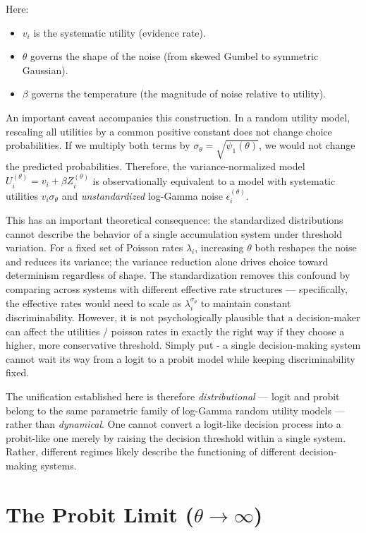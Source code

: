 \documentclass[
  man,
  floatsintext,
  longtable,
  a4paper,
  nolmodern,
  notxfonts,
  notimes,
  colorlinks=true,linkcolor=blue,citecolor=blue,urlcolor=blue]{apa7}
\providecommand{\tightlist}{%
  \setlength{\itemsep}{0pt}\setlength{\parskip}{0pt}}
\begin{document}
Here:

\begin{itemize}
\tightlist
\item
  \(v_i\) is the systematic utility (evidence rate).
\item
  \(\theta\) governs the shape of the noise (from skewed Gumbel to
  symmetric Gaussian).
\item
  \(\beta\) governs the temperature (the magnitude of noise relative to
  utility).
\end{itemize}

An important caveat accompanies this construction. In a random utility
model, rescaling all utilities by a common positive constant does not
change choice probabilities. If we multiply both terms by
\(\sigma_\theta = \sqrt{\psi_1(\theta)}\), we would not change the
predicted probabilities. Therefore, the variance-normalized model
\(U_i^{(\theta)} = v_i + \beta Z_i^{(\theta)}\) is observationally
equivalent to a model with systematic utilities \(v_i \sigma_\theta\)
and \emph{unstandardized} log-Gamma noise \(\epsilon_i^{(\theta)}\).

This has an important theoretical consequence: the standardized
distributions cannot describe the behavior of a single accumulation
system under threshold variation. For a fixed set of Poisson rates
\(\lambda_i\), increasing \(\theta\) both reshapes the noise and reduces
its variance; the variance reduction alone drives choice toward
determinism regardless of shape. The standardization removes this
confound by comparing across systems with different effective rate
structures --- specifically, the effective rates would need to scale as
\(\lambda_i^{\sigma_\theta}\) to maintain constant discriminability.
However, it is not psychologically plausible that a decision-maker can
affect the utilities / poisson rates in exactly the right way if they
choose a higher, more conservative threshold. Simply put - a single
decision-making system cannot wait its way from a logit to a probit
model while keeping discriminability fixed.

The unification established here is therefore \emph{distributional} ---
logit and probit belong to the same parametric family of log-Gamma
random utility models --- rather than \emph{dynamical}. One cannot
convert a logit-like decision process into a probit-like one merely by
raising the decision threshold within a single system. Rather, different
regimes likely describe the functioning of different decision-making
systems.

\section{\texorpdfstring{The Probit Limit
(\(\theta \to \infty\))}{The Probit Limit (\textbackslash theta \textbackslash to \textbackslash infty)}}\label{sec-probit-limit}
\end{document}
